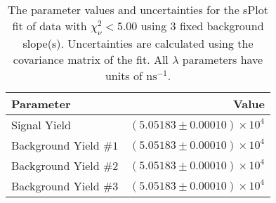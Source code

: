 
\begin{table}
    \begin{center}
        \begin{tabular}{lr}\toprule
            Parameter & Value \\\midrule
            Signal Yield & $(5.05183 \pm 0.00010) \times 10^{4}$ \\
            Background Yield $\#1$ & $(5.05183 \pm 0.00010) \times 10^{4}$ \\
            Background Yield $\#2$ & $(5.05183 \pm 0.00010) \times 10^{4}$ \\
            Background Yield $\#3$ & $(5.05183 \pm 0.00010) \times 10^{4}$ \\\bottomrule
        \end{tabular}
        \caption{The parameter values and uncertainties for the sPlot fit of data with $\chi^2_\nu < 5.00$ using 3 fixed background slope(s). Uncertainties are calculated using the covariance matrix of the fit. All $\lambda$ parameters have units of $\si{\nano\second}^{-1}$.}
    \end{center}
\end{table}
